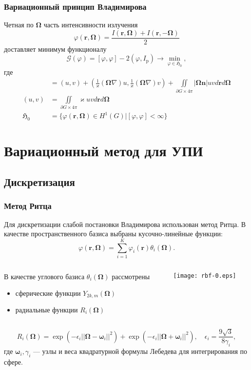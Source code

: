 \documentclass[unicode,aspectratio=43]{beamer}
\newcommand{\I}{\mathrm{\mathit{I}}}
\newcommand{\Ip}{\mathrm{\mathit{I}}_\text{p}}
\renewcommand{\vec}[1]{\boldsymbol{\mathbf{#1}}}
\begin{document}
\begin{frame}\frametitle{Вариационный принцип Владимирова}
	Четная по $\vec \Omega$ часть интенсивности излучения
	\[
	\varphi(\vec r, \vec \Omega) = \frac{\I(\vec r, \vec \Omega) + \I(\vec r, -\vec \Omega)}{2}
	\]
	доставляет минимум функционалу
	\[
	\mathcal{G}(\varphi) = [\varphi, \varphi] - 2(\varphi, \Ip) \to \min_{\varphi \in \mathfrak{H}_0},
	\]
	где
	\begin{align*}
	[u,v] &= (u, v) + \left(\frac{1}{\varkappa}(\vec \Omega \nabla) u, \frac{1}{\varkappa}(\vec \Omega \nabla) v\right)
	+ \iint\limits_{\partial G \times 4\pi} |\vec \Omega \vec n|uv d \vec r d\vec \Omega\\
	(u,v) &= \iint\limits_{\partial G \times 4\pi} \varkappa uv d \vec r d\vec
\Omega\\
	\mathfrak H_0 &= \Big\{\varphi(\vec r, \vec \Omega) \in H^{1}(G) \Big|
[\varphi, \varphi] < \infty\Big\}
	\end{align*}

\end{frame}

\section{Вариационный метод для УПИ}
\subsection{Дискретизация}
\begin{frame}\frametitle{Метод Ритца}
	Для дискретизации слабой постановки Владимирова использован метод Ритца. В качестве пространственного базиса выбраны кусочно-линейные функции:
	\[
	\varphi(\vec r, \vec \Omega) = \sum_{i= 1}^K \varphi_i(\vec r) \theta_i(\vec \Omega).
	\]
	\begin{columns}
	\begin{column}{.8\textwidth}
	В качестве углового базиса $\theta_i(\vec \Omega)$ рассмотрены
	\begin{itemize}
	\item сферические функции $Y_{2k,m}(\vec \Omega)$
	\item радиальные функции $R_i(\vec \Omega)$
	\end{itemize}
	\end{column}
	\begin{column}{.15\textwidth}
	\raggedleft \texttt{[image: rbf-0.eps]}
	\end{column}
	\end{columns}
	\[
	R_i(\vec \Omega) = \exp\left(-\epsilon_i ||\vec \Omega - \vec \omega_i||^2\right) + \exp\left(-\epsilon_i ||\vec \Omega + \vec \omega_i||^2\right), \quad
	\epsilon_i = \frac{9\sqrt{3}}{8\gamma_i},
	\]
	где $\vec \omega_i, \gamma_i$ --- узлы и веса квадратурной формулы Лебедева для интегрирования по сфере.
\end{frame}	
\end{document}
